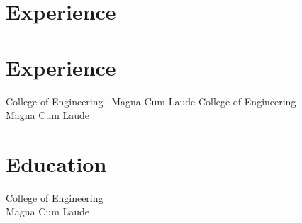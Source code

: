 \documentclass[]{resume}
\begin{document}
\processdata{}



\lastupdated{}





\noindent
\begin{minipage}[t]{\goldenleft\textwidth}
  \section{Experience}

  \section{Experience}
  College of Engineering \
  Magna Cum Laude
  College of Engineering \\
  Magna Cum Laude
\end{minipage}%
\hfill%
\begin{minipage}[t]{\goldenright\textwidth}
  \section{Education}
  College of Engineering \\
  Magna Cum Laude
\end{minipage}

\end{document}
